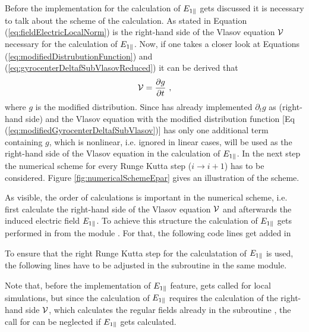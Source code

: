 Before the implementation for the calculation of $E_{1\parallel}$ gets discussed it is necessary to talk about the scheme of the calculation. As stated in Equation (\ref{eq:fieldElectricLocalNorm}) is the right-hand side of the Vlasov equation $\mathcal{V}$ necessary for the calculation of $E_{1\parallel}$. Now, if one takes a closer look at Equations (\ref{eq:modifiedDistrubutionFunction}) and (\ref{eq:gyrocenterDeltafSubVlasovReduced}) it can be derived that
\begin{gather}
    \mathcal{V} = \frac{\partial g}{\partial t}~,
    \label{eq:rightHandSide}
\end{gather}
where $g$ is the modified distribution. Since \gkw has already implemented $\partial_t g$ as  (right-hand side) and the Vlasov equation with the modified distribution function [Eq (\ref{eq:modifiedGyrocenterDeltafSubVlasov})] has only one additional term containing $g$, which is nonlinear, i.e. ignored in linear cases,  will be used as the right-hand side of the Vlasov equation in the calculation of $E_{1\parallel}$. In the next step the numerical scheme for every Runge Kutta step ($i \rightarrow i+1$) has to be considered. Figure \ref{fig:numericalSchemeEpar} gives an illustration of the scheme.


As visible, the order of calculations is important in the numerical scheme, i.e. first calculate the right-hand side of the Vlasov equation $\mathcal{V}$ and afterwards the induced electric field $E_{1\parallel}$. To achieve this structure the calculation of $E_{1\parallel}$ gets performed in  from the module . For that, the following code lines get added in 



To ensure that the right Runge Kutta step for the calculatation of $E_{1\parallel}$ is used, the following lines have to be adjusted in the subroutine  in the same module.



Note that, before the implementation of $E_{1\parallel}$ feature,  gets called for local simulations, but since the calculation of $E_{1\parallel}$ requires the calculation of the right-hand side $\mathcal{V}$, which calculates the regular fields already in the subroutine , the call for  can be neglected if $E_{1\parallel}$ gets calculated.

